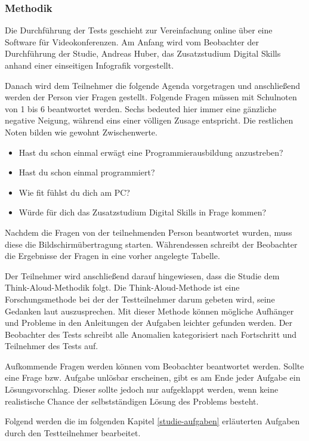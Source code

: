 \subsubsection{Methodik}
Die Durchführung der Tests geschieht zur Vereinfachung online über eine Software
für Videokonferenzen. Am Anfang wird vom Beobachter der Durchführung der
Studie, Andreas Huber, das Zusatzstudium Digital Skills anhand einer
einseitigen Infografik vorgestellt.

Danach wird dem Teilnehmer die folgende Agenda vorgetragen und anschließend
werden der Person vier Fragen gestellt. Folgende Fragen müssen mit Schulnoten
von 1 bis 6 beantwortet werden. Sechs bedeuted hier immer eine gänzliche
negative Neigung, während eins einer völligen Zusage entspricht. Die restlichen
Noten bilden wie gewohnt Zwischenwerte.
\begin{itemize}
    \item Hast du schon einmal erwägt eine Programmierausbildung anzustreben?
    \item Hast du schon einmal programmiert?
    \item Wie fit fühlst du dich am PC?
    \item Würde für dich das Zusatzstudium Digital Skills in Frage kommen?
\end{itemize}

Nachdem die Fragen von der teilnehmenden Person beantwortet wurden, muss diese
die Bildschirmübertragung starten. Währendessen schreibt der Beobachter die
Ergebnisse der Fragen in eine vorher angelegte Tabelle.

Der Teilnehmer wird anschließend darauf hingewiesen, dass die Studie dem Think-Aloud-Methodik folgt. Die Think-Aloud-Methode ist eine Forschungsmethode
bei der der Testteilnehmer darum gebeten wird, seine Gedanken laut
auszusprechen. Mit dieser Methode können mögliche Aufhänger und Probleme in den Anleitungen der Aufgaben leichter gefunden werden. Der Beobachter des Tests
schreibt alle Anomalien kategorisiert nach Fortschritt und Teilnehmer des Tests
auf.

Aufkommende Fragen werden können vom Beobachter beantwortet werden. Sollte eine
Frage bzw. Aufgabe unlösbar erscheinen, gibt es am Ende jeder Aufgabe ein
Lösungsvorschlag. Dieser sollte jedoch nur aufgeklappt werden, wenn keine
realistische Chance der selbstständigen Lösung des Problems besteht.

Folgend werden die im folgenden Kapitel \ref{studie-aufgaben} erläuterten
Aufgaben durch den Testteilnehmer bearbeitet.

